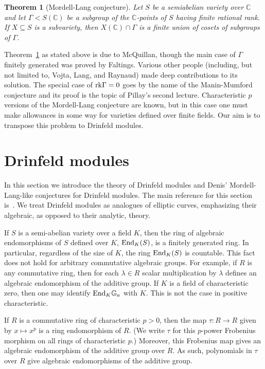 \documentclass{amsart}
\newcommand{\Ga}{{{\mathbb G}_a}}
\newcommand{\CC}{{\mathbb C}}
\newtheorem{thm}{Theorem}[section]
\theoremstyle{definition}
\theoremstyle{remark}
\begin{document}
\begin{thm}[Mordell-Lang conjecture]
\label{ML}
Let $S$ be a semiabelian variety over $\CC$ and let $\Gamma < S(\CC)$ be a 
subgroup of the $\CC$-points of $S$ having finite rational rank.  If $X \subseteq S$
is a subvariety, then $X(\CC) \cap \Gamma$ is a finite union of cosets of
subgroups of $\Gamma$.
\end{thm}

Theorem~\ref{ML} as stated above is due to McQuillan, though the main case of $\Gamma$
finitely generated was proved by Faltings.  Various other people 
(including, but not limited to, Vojta, Lang, and Raynaud)
made deep contributions
to its solution.  
The special case of ${\rm rk} \Gamma = 0$ goes by the name of the Manin-Mumford
conjecture and its proof is the topic of Pillay's second lecture.  Characteristic
$p$ versions of the Mordell-Lang conjecture are known, but in this case one 
must make allowances in some way for varieties defined over finite fields.  
Our aim is to transpose this problem to Drinfeld modules.  


\section{Drinfeld modules}
\label{DM}

In this section we introduce the theory of Drinfeld modules and Denis' 
Mordell-Lang-like conjectures for Drinfeld modules.  The main reference
for this section is~\cite{Goss}.  
We treat Drinfeld modules as analogues of elliptic curves, emphasizing their
algebraic, as opposed to their analytic, theory. 


If $S$ is a semi-abelian variety over a field $K$, then the
ring of algebraic endomorphisms of $S$ defined over $K$, 
${\rm End}_K(S)$, is a finitely generated ring.  In particular, regardless
of the size of $K$, the ring ${\rm End}_K(S)$ is countable.  
This fact does not hold for arbitrary commutative algebraic 
groups.  For example, if $R$ is any commutative ring, then 
for each $\lambda \in R$ scalar multiplication by $\lambda$
defines an algebraic endomorphism of the additive group.  If $K$
is a field of characteristic zero, then one may identify 
${\rm End}_K \Ga$  with $K$.  This is not the case in positive 
characteristic.  

If $R$ is a commutative ring of characteristic $p > 0$, then the 
map  $\tau:R \to R$ given by 
$x \mapsto x^p$ is a ring endomorphism of $R$. (We write $\tau$
for this $p$-power Frobenius morphism on all rings of characteristic $p$.)
Moreover, this
Frobenius map gives an algebraic endomorphism of the additive group over
$R$.  As such, polynomials in $\tau$ over $R$ give algebraic
endomorphisms of the additive group.
\end{document}
